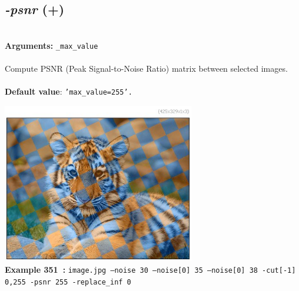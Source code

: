 \documentclass[a4paper,11pt,twoside]{book}
\begin{document}
\subsection{\emph{-psnr} (+)}\vspace*{-0.5em}
~\\\textbf{Arguments: } 
{\small \texttt{\_max\_value}}\\~\\
Compute PSNR (Peak Signal-to-Noise Ratio) matrix between selected images.
~\\~\\\textbf{Default value}: {\small \texttt{'max\_value=255'.}}
\begin{center}\includegraphics[keepaspectratio=true,height=7cm,width=\textwidth]{img/gmic_def351.jpg}\\
{\footnotesize \textbf{Example 351~:} \texttt{image.jpg --noise 30 --noise[0] 35 --noise[0] 38 -cut[-1] 0,255 -psnr 255 -replace\_inf 0}}
\end{center}
\end{document}
